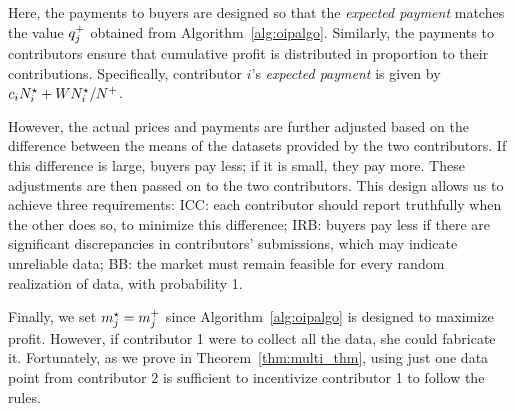 Here, the payments to buyers are designed so that the \emph{expected payment} matches the value $q_j^{+}$ obtained from Algorithm~\ref{alg:oipalgo}. Similarly, the payments to contributors ensure that cumulative profit is distributed in proportion to their contributions. Specifically, contributor $i$'s \emph{expected payment} is given by $c_iN^\star_i + W N^\star_i/N^{+}$.

However, the actual prices and payments are further adjusted based on the difference between the means of the datasets provided by the two contributors. If this difference is large, buyers pay less; if it is small, they pay more. These adjustments are then passed on to the two contributors.
This design allows us to achieve three requirements: ICC: each contributor should report truthfully when the other does so, to minimize this difference;
IRB: buyers pay less if there are significant discrepancies in contributors' submissions, which may indicate unreliable data;
BB: the market must remain feasible for every random realization of data, \ie with probability 1.

Finally, we set $m^\star_j=m_{j}^{+}$ since Algorithm~\ref{alg:oipalgo} is designed to maximize profit. However, if contributor 1 were to collect all the data, she could fabricate it. Fortunately, as we prove in Theorem~\ref{thm:multi_thm}, using just one data point from contributor 2 is sufficient to incentivize contributor 1 to follow the rules.







